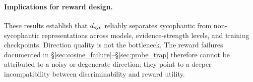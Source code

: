 \paragraph{Implications for reward design.}
These results establish that $d_{\text{syc}}$ reliably separates sycophantic from non-sycophantic representations across models, evidence-strength levels, and training checkpoints.
Direction quality is not the bottleneck.
The reward failures documented in \S\ref{sec:cosine_failure}--\S\ref{sec:probe_trap} therefore cannot be attributed to a noisy or degenerate direction; they point to a deeper incompatibility between discriminability and reward utility.
